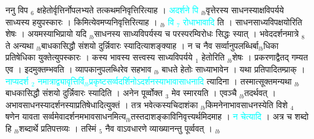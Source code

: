 \documentclass[article,12pt,a4paper]{memoir}%
\newcommand{\quotelemma}[1]{\textcolor{cyan}{#1}}
\newcounter{parCount}
\begin{document}
	  
	  \pstart \leavevmode%
	ननु विप {\tiny $_{6}$} क्षहेतोर्वृत्तिर्नोपलभ्यते तत्कथमनिवृत्तिरित्याह । \quotelemma{अदर्शने \cite[1b6]{vn-msN} पि} {\tiny $_{lb}$}वृत्तेरस्य साधनस्याक्षविपर्यये साध्यस्य हयुपस्कारः । किमित्येवमप्यनिवृत्तिरित्याह । {\tiny $_{lb}$} \quotelemma{वि {\tiny $_{7}$} रोधाभावादि} \cite[1b6]{vn-msN} ति । साधनसाध्यविपक्षयोरिति शेषः । अयमस्याभिप्रायो यदि {\tiny $_{lb}$}साधनस्य साध्यविपर्यस्य च परस्परम्विरोधः सिद्धः स्यात् । भवेददर्शनमात्रे {\tiny $_{8}$} \leavevmode{} ते अन्यथा {\tiny $_{lb}$}बाधकासिद्धौ संशयो दुर्न्निवारः स्यादित्याशङ्क्याह । न च नैव सर्व्वानुपलब्धिर्बा{\tiny $_{lb}$}धिका प्रतिषेधिका युक्तेत्युपस्कारः । कस्य भावस्य सत्त्वस्य साध्यविपर्यये {\tiny $_{1}$} हेतोरिति {\tiny $_{lb}$}शेषः । प्रकरणाद्वैतद् गम्यत एव । इदमुक्तम्भवति । व्यापकानुपलब्धिरेव सहभाव {\tiny $_{lb}$} \leavevmode{} बाधते हेतोः साध्याभावेन । यथा प्रतिपादितम्प्राक् । \quotelemma{नाप्यदर्श {\tiny $_{2}$} नमात्राद्व्यावृत्तिर्वि{\tiny $_{lb}$}प्रकृष्टसर्व्वदर्शिनोऽदर्शनस्याभावासाधनादि} \cite[1b7]{vn-msN} त्यादिना । तस्मात्सूक्तमन्यथा {\tiny $_{lb}$}बाधकासिद्धौ संशयो दुर्न्निवारः स्यादिति । अनेन पूर्व्वोक्त {\tiny $_{3}$} मेव स्मारयति । एवञ्चै {\tiny $_{lb}$}तदर्थवत् । अभावसाधनस्यादर्शनस्याप्रतिषेधादित्युक्तं । तत्र भवेत्कस्यचिदाशंका {\tiny $_{lb}$}किमनेनाभावसाधनस्येति विशे {\tiny $_{4}$} षणेन यावता सर्व्वमेवादर्शनमभावसाधनमित्य{\tiny $_{lb}$}तस्तदाशङ्काविनिवृत्त्यर्थमिदमाह । \quotelemma{न चेत्यादि} \cite[1b11]{vn-msN} । अत्र च शब्दो हि {\tiny $_{lb}$}शब्दार्थे प्रतिपत्तव्यः । तस्मिं {\tiny $_{5}$} नैव वाऽवधारणे व्याख्यानन्तु पूर्व्ववत् ।
	{}
	\pend%
      {\tiny $_{lb}$}
\end{document}
